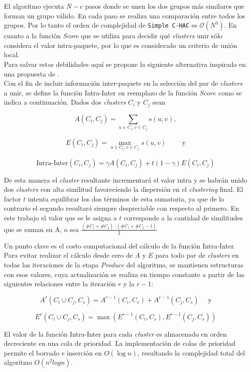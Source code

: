 El algoritmo ejecuta $N - c$ pasos donde se unen los dos grupos más similares que forman un grupo válido. En cada paso se realiza una comparación entre todos los grupos. Por lo tanto el orden de complejidad de \texttt{Simple C-HAC} es $\mathcal{O}(N^{3})$. En cuanto a la función \textit{Score} que se utiliza para decidir qué {\em clusters} unir sólo considera el valor intra-paquete, por lo que es considerado un criterio de unión local.\\

Para salvar estas debilidades aquí se propone la siguiente alternativa inspirada en una propuesta de \cite{MRS}.\\

Con el fin de incluir información inter-paquete en la selección del par de {\em clusters} a unir, se define la función Intra-Inter en reemplazo de la función $Score$ como se indica a continuación. Dados dos {\em clusters} $C_i$ y $C_j$ sean

$$A(C_i,C_j) = \sum_{u \in C_i, v \in C_j}{s(u,v)},$$

$$E(C_i,C_j)=\max_{u \in C_i, v \in C_j}{s(u,v)} \qquad \mbox{ y}$$

$$\mbox{Intra-Inter}(C_i,C_j) = \gamma A(C_i,C_j) + t (1-\gamma) E(C_i,C_j)$$

De esta manera el {\em cluster} resultante incrementará el valor intra y se habrán unido dos {\em clusters} con alta similitud favoreciendo la dispersión en el {\em clustering} final. El factor $t$ intenta equilibrar los dos términos de esta sumatoria, ya que de lo contrario el segundo resultará siempre despreciable con respecto al primero. En este trabajo el valor que se le asigna a $t$ corresponde a la cantidad de similitudes que se suman en A, o sea $\frac{(\#C_i + \#C_j) \cdot (\#C_i + \#C_j - 1)}{2}$  

Un punto clave es el costo computacional del cálculo de la función Intra-Inter. Para evitar realizar el cálculo desde cero de $A$ y $E$ para todo par de {\em clusters} en todas las iteraciones de la etapa \emph{Produce} del algoritmo, se  mantienen estructuras con esos valores, cuya actualización se realiza en tiempo constante a partir de las siguientes relaciones entre la iteración $r$ y la $r-1$:

$$A^r(C_i \cup C_j, C_s) = A^{r-1}(C_i,C_s) + A^{r-1}(C_j,C_s) \quad \mbox{ y}$$

$$E^r(C_i \cup C_j,C_s) = \max (E^{r-1}(C_i,C_s),E^{r-1}(C_j,C_s))$$

El valor de la función Intra-Inter para cada {\em cluster} es almacenado en orden decreciente en una cola de prioridad. La implementación de colas de prioridad permite el borrado e inserción en $O(\log n)$, resultando la complejidad total del algoritmo $O(n^2 log n)$.\\

